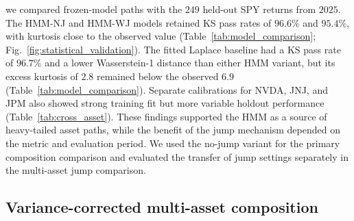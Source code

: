 we compared frozen-model paths with the $249$ held-out SPY returns
from $2025$. The HMM-NJ and HMM-WJ models retained KS pass rates of
$96.6\%$ and $95.4\%$, with kurtosis close to the observed value
(Table~\ref{tab:model_comparison};
Fig.~\ref{fig:statistical_validation}). The fitted Laplace
baseline had a KS pass rate of $96.7\%$ and a lower Wasserstein-1
distance than either HMM variant, but its excess kurtosis of $2.8$
remained below the observed $6.9$ (Table~\ref{tab:model_comparison}).
Separate calibrations for
NVDA, JNJ, and JPM also showed strong training fit but more variable
holdout performance (Table~\ref{tab:cross_asset}). These findings
supported the HMM as a source of heavy-tailed asset paths, while the
benefit of the jump mechanism depended on the metric and evaluation
period. We used the no-jump variant for the primary composition
comparison and evaluated the transfer of jump settings separately
in the multi-asset jump comparison.


\subsection{Variance-corrected multi-asset composition}

